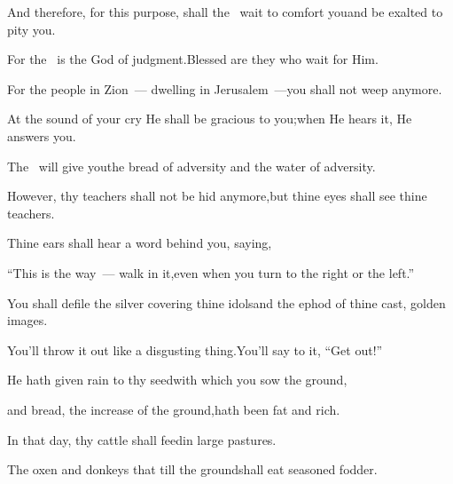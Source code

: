
\begin{inparaenum}
  \pa{} And therefore, for this purpose, shall the \lord\ wait to comfort you\pa{}and be exalted to pity you.%

  \pa{}For the \lord\ is the God of judgment.\pa{}Blessed are they who wait for Him.%

  \pa{} For the people in Zion~--- dwelling in Jerusalem~---\pa{}you shall not weep anymore.%

  \pa{}At the sound of your cry He shall be gracious to you;\pa{}when He hears it, He answers you.%

  \pa{} The \lord\ will give you\pa{}the bread of adversity and the water of adversity.%

  \pa{}However, thy teachers shall not be hid anymore,\pa{}but thine eyes shall see thine teachers.%

  \pa{} Thine ears shall hear a word behind you, saying,%

  \pa{}``This is the way~--- walk in it,\pa{}even when you turn to the right or the left.''%

  \pa{} You shall defile the silver covering thine idols\pa{}and the ephod of thine cast, golden images.%

  \pa{}You'll throw it out like a disgusting thing.\pa{}You'll say to it, ``Get out!''%

  \pa{} He hath given rain to thy seed\pa{}with which you sow the ground,%

  \pa{}and bread, the increase of the ground,\pa{}hath been fat and rich.%

  \pa{}In that day, thy cattle shall feed\pa{}in large pastures.%

  \pa{} The oxen and donkeys that till the ground\pa{}shall eat seasoned fodder.%
\end{inparaenum}
